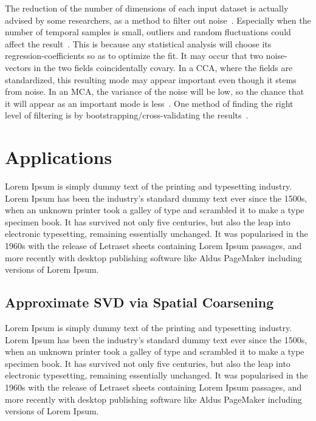 \documentclass{acm_proc_article-sp}
\begin{document}
The reduction of the number of dimensions of each input dataset is actually advised by some researchers, as a method to filter out noise~\cite{Barnett1987}. Especially when the number of temporal samples is small, outliers and random fluctuations could affect the result~\cite{Bretherton1992}. This is because any statistical analysis will choose its regression-coefficients so as to optimize the fit. It may occur that two noise-vectors in the two fields coincidentally covary. In a CCA, where the fields are standardized, this resulting mode may appear important even though it stems from noise. In an MCA, the variance of the noise will be low, so the chance that it will appear as an important mode is less~\cite{Bretherton1992}. One method of finding the right level of filtering is by bootstrapping/cross-validating the results~\cite{Livezey1999}.

\section{Applications}
\label{Applications}

Lorem Ipsum is simply dummy text of the printing and typesetting industry. Lorem Ipsum has been the industry's standard dummy text ever since the 1500s, when an unknown printer took a galley of type and scrambled it to make a type specimen book. It has survived not only five centuries, but also the leap into electronic typesetting, remaining essentially unchanged. It was popularised in the 1960s with the release of Letraset sheets containing Lorem Ipsum passages, and more recently with desktop publishing software like Aldus PageMaker including versions of Lorem Ipsum.

\subsection{Approximate SVD via Spatial Coarsening}
\label{sec:Applications Approximate SVD via Spatial Coarsening}

Lorem Ipsum is simply dummy text of the printing and typesetting industry. Lorem Ipsum has been the industry's standard dummy text ever since the 1500s, when an unknown printer took a galley of type and scrambled it to make a type specimen book. It has survived not only five centuries, but also the leap into electronic typesetting, remaining essentially unchanged. It was popularised in the 1960s with the release of Letraset sheets containing Lorem Ipsum passages, and more recently with desktop publishing software like Aldus PageMaker including versions of Lorem Ipsum.
\end{document}
